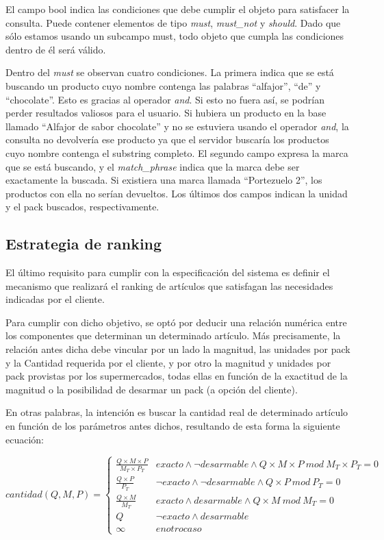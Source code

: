 \documentclass[12pt]{article} %
\begin{document}
El campo bool indica las condiciones que debe cumplir el objeto para satisfacer la consulta. Puede contener elementos de tipo \textit{must}, \textit{must\_not} y \textit{should}. Dado que sólo estamos usando un subcampo must, todo objeto que cumpla las condiciones dentro de él será válido.

Dentro del \textit{must} se observan cuatro condiciones. La primera indica que se está buscando un producto cuyo nombre contenga las palabras “alfajor”, “de” y “chocolate”. Esto es gracias al operador \textit{and}. Si esto no fuera así, se podrían perder resultados valiosos para el usuario. Si hubiera un producto en la base llamado “Alfajor de sabor chocolate” y no se estuviera usando el operador \textit{and}, la consulta no devolvería ese producto ya que el servidor buscaría los productos cuyo nombre contenga el substring completo. El segundo campo expresa la marca que se está buscando, y el \textit{match\_phrase} indica que la marca debe ser exactamente la buscada. Si existiera una marca llamada “Portezuelo 2”, los productos con ella no serían devueltos. Los últimos dos campos indican la unidad y el pack buscados, respectivamente.


\subsection{Estrategia de ranking}
El último requisito para cumplir con la especificación del sistema es definir el mecanismo que realizará el ranking de artículos que satisfagan las necesidades indicadas por el cliente. 

Para cumplir con dicho objetivo, se optó por deducir una relación numérica entre los componentes que determinan un determinado artículo. Más precisamente, la relación antes dicha debe vincular por un lado la magnitud, las unidades por pack y la Cantidad requerida por el cliente, y por otro la magnitud y unidades por pack provistas por los supermercados, todas ellas en función de la exactitud de la magnitud o la posibilidad de desarmar un pack (a opción del cliente). 

En otras palabras, la intención es buscar la cantidad real de determinado artículo en función de los parámetros antes dichos, resultando de esta forma la siguiente ecuación:

\[
cantidad(Q,M,P) =
\begin{cases} 
\frac{Q\times M\times P}{M_T \times P_T} & exacto \wedge \neg desarmable \wedge Q\times M\times P\ mod\ M_T \times P_T = 0 \\ 
\frac{Q\times P}{P_T} &  \neg exacto \wedge \neg desarmable \wedge Q\times P\ mod\ P_T = 0 \\
\frac{Q\times M}{M_T} & exacto \wedge desarmable \wedge Q\times M\ mod\ M_T = 0 \\
Q & \neg exacto \wedge desarmable \\
\infty & en otro caso


\end{cases}
\] 
\end{document}
